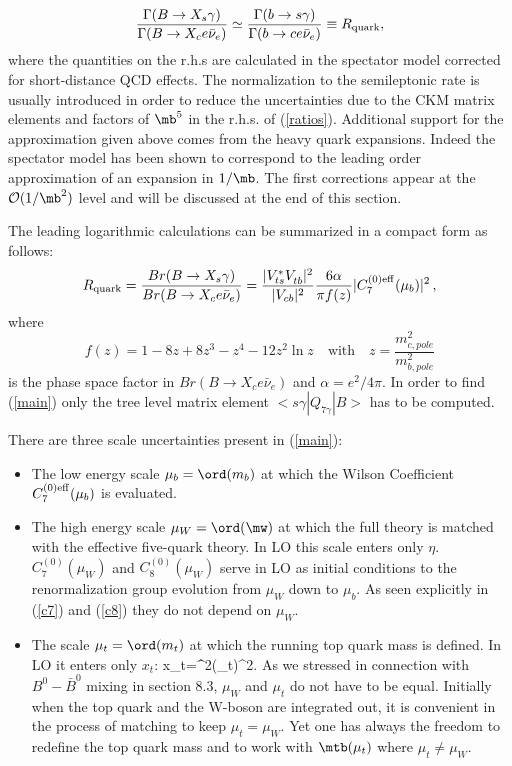 \begin{equation}\label{ratios}
\frac{\Gamma(B \to X_s \gamma)}
     {\Gamma(B \to X_c e \bar{\nu}_e)}
 \simeq                                                     
\frac{\Gamma(b \to s \gamma)}
     {\Gamma(b \to c e \bar{\nu}_e)} \equiv R_{{\rm quark}},
\end{equation}
where the quantities on the r.h.s are calculated in the spectator model
corrected for short-distance QCD effects. The normalization to the
semileptonic rate is usually introduced in order to reduce the
uncertainties due to the CKM matrix
elements and factors of $\mb^5$ in the r.h.s. of (\ref{ratios}).
Additional support for the approximation given above comes from the
heavy quark expansions.  Indeed the spectator model has been shown to
correspond to the leading order approximation of an expansion in
$1/\mb$.  The first corrections appear at the ${\cal O}(1/\mb^2)$
level and will be discussed at the end of this section. 

The leading
logarithmic calculations 
\cite{Grin,CFRS:94,CCRV:94a,Mis:94,AG1,BMMP:94} 
can be summarized in a compact form
as follows:
\begin{equation}\label{main}
R_{{\rm quark}} =\frac{Br(B \to X_s \gamma)}
     {Br(B \to X_c e \bar{\nu}_e)}=
 \frac{|V_{ts}^* V_{tb}^{}|^2}{|V_{cb}|^2} 
\frac{6 \alpha}{\pi f(z)} |C^{(0){\rm eff}}_{7}(\mu_b)|^2\,,
\end{equation}
where
\begin{equation}\label{g}
f(z) = 1 - 8z + 8z^3 - z^4 - 12z^2 \ln z           
\quad\mbox{with}\quad
z =
\frac{m^2_{c,pole}}{m^2_{b,pole}}
\end{equation}
is the phase space factor in $Br(B \to X_c e \bar{\nu}_e)$ and
$\alpha=e^2/4\pi$. In order to find (\ref{main}) only the tree level
matrix element $<s\gamma|Q_{7\gamma}|B>$ has to be computed. 

\noindent
There are three scale uncertainties present in (\ref{main}):
\begin{itemize}
\item
The low energy scale $\mu_b=\ord(m_b)$ at which the Wilson
Coefficient $C_{7}^{(0){\rm eff}}(\mu_b)$ is evaluated.
\item
The high energy scale $\mu_W=\ord(\mw)$ at which 
the full theory is matched with the effective five-quark theory.
In LO this scale enters only $\eta$.
$C_{7}^{(0)}(\mu_W)$ and  $C_{8}^{(0)}(\mu_W)$
serve in LO as initial
conditions to the renormalization group evolution from $\mu_W$ down
to $\mu_b$. As seen explicitly in (\ref{c7}) and (\ref{c8}) they do
not depend on $\mu_W$.
\item
The scale $\mu_t=\ord(m_t)$ at which the running top quark mass is
defined. In LO it enters only $x_t$: 
\be\label{xt}
x_t=\f{\mtb^2(\mu_t)}{\mw^2}.
\ee
As we stressed in connection with $B^0-\bar B^0$ mixing
in section 8.3, $\mu_W$ and $\mu_t$ do not have to be
equal. Initially when the top quark and the W-boson are integrated
out, it is convenient in the process of matching to keep
$\mu_t=\mu_W$. Yet one has always the freedom to redefine the top
quark mass and to work with $\mtb(\mu_t)$ where $\mu_t\not=\mu_W$.
\end{itemize}

